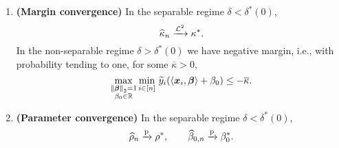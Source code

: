 \begin{thm}
\begin{enumerate}[label=(\alph*)]
        \item \label{thm:SVM_main_mar} 
        \textbf{(Margin convergence)} In the separable regime $\delta < \delta^*(0)$,
        \begin{equation*}
            \widehat\kappa_n \xrightarrow{\mathcal{L}^{2}} \kappa^*.
        \end{equation*}
        In the non-separable regime $\delta > \delta^*(0)$ we have negative margin, i.e., with probability tending to one, for some $\overline{\kappa} > 0$,
        \begin{equation*}
            \max_{ \substack{ \left\|{\text{\boldmath $\beta$}}\right\|_2 = 1 \\ \beta_0 \in \mathbb{R} } } \min_{i \in [n]} \, \widetilde y_i ( \langle \text{\boldmath $x$}_i, \text{\boldmath $\beta$} \rangle + \beta_0 )  \le  -\overline{\kappa}.
        \end{equation*}

        \item \label{thm:SVM_main_param} 
        \textbf{(Parameter convergence)} In the separable regime $\delta < \delta^*(0)$,
        \begin{equation*}
            \widehat\rho_n \xrightarrow{\mathrm{p}} \rho^*,
            \qquad
            \widehat\beta_{0,n} \xrightarrow{\mathrm{p}} \beta_0^*.
        \end{equation*}


\end{enumerate}
\end{thm}
